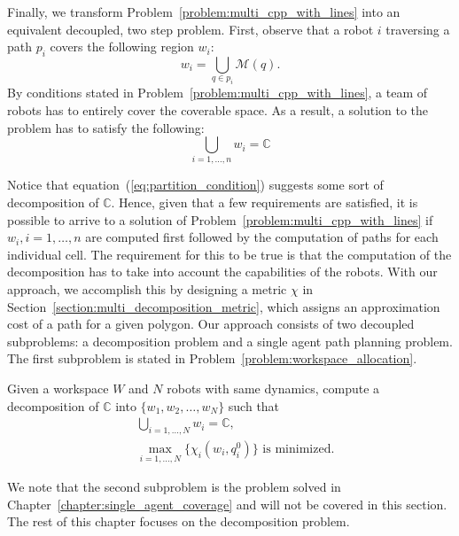 \documentclass[../main.tex]{subfiles}
\begin{document}
Finally, we transform Problem~\ref{problem:multi_cpp_with_lines} into an equivalent decoupled, two step problem. First, observe that a robot $i$ traversing a path $p_i$ covers the following region $w_i$:
\begin{equation}
	w_i=\bigcup_{q\in p_i}\mathcal{M}(q).
\end{equation}
By conditions stated in Problem~\ref{problem:multi_cpp_with_lines}, a team of robots has to entirely cover the coverable space. As a result, a solution to the problem has to satisfy the following:
\begin{equation}
	\label{eq:partition_condition}
	\bigcup_{i=1,\ldots,n}w_i=\mathbb{C}
\end{equation}

Notice that equation~(\ref{eq:partition_condition}) suggests some sort of decomposition of $\mathbb{C}$. Hence, given that a few requirements are satisfied, it is possible to arrive to a solution of Problem~\ref{problem:multi_cpp_with_lines} if $w_i,i=1,\ldots,n$ are computed first followed by the computation of paths for each individual cell. The requirement for this to be true is that the computation of the decomposition has to take into account the capabilities of the robots. With our approach, we accomplish this by designing a metric $\chi$ in Section~\ref{section:multi_decomposition_metric}, which assigns an approximation cost of a path for a given polygon. Our approach consists of two decoupled subproblems: a decomposition problem and a single agent path planning problem. The first subproblem is stated in Problem~\ref{problem:workspace_allocation}.

\begin{problem}
\label{problem:workspace_allocation}
	Given a workspace $W$ and $N$ robots with same dynamics, compute a decomposition of $\mathbb{C}$ into $\{w_1,w_2,\dots,w_N\}$ such that
	\begin{equation}
	\begin{aligned}
		& \bigcup_{i=1,\dots,N}w_i=\mathbb{C},\\
		& \max_{i=1,\ldots,N}\{\chi_i(w_i,q^0_i)\}\text{ is minimized.}
	\end{aligned}
	\end{equation}
\end{problem}

We note that the second subproblem is the problem solved in Chapter~\ref{chapter:single_agent_coverage} and will not be covered in this section. The rest of this chapter focuses on the decomposition problem.
\end{document}
